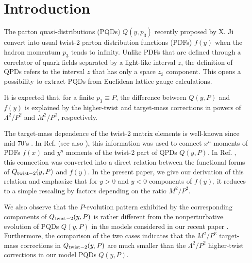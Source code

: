 \documentclass[final,5p,times,twocolumn]{elsarticle}
\begin{document}
   
\section{Introduction}

The parton quasi-distributions (PQDs) $Q(y,p_3)$
recently  proposed by X. Ji  \cite{Ji:2013dva} convert into  usual twist-2 parton distribution 
functions (PDFs) $f(y)$ when the hadron momentum $p_3$ tends to infinity.
Unlike PDFs that are  defined through a correlator of quark fields separated by 
a light-like interval $z$, the definition of QPDs  refers to  the interval $z$ that
has only a space $z_3$ component. This opens a possibility 
to extract PQDs from Euclidean lattice gauge calculations. 

It is expected that,  for a finite $p_3\equiv P$, the difference between $Q(y,P)$ and $f(y)$ 
is  explained  by the higher-twist  and target-mass corrections in powers of $\Lambda^2/P^2$  
and $M^2/P^2$, respectively. 

The target-mass dependence of the twist-2 matrix elements is well-known since mid 70's
\cite{Nachtmann:1973mr,Georgi:1976ve}. In Ref. \cite{Lin:2014zya}    
(see also \cite{Alexandrou:2015rja,Monahan:2016bvm,Zhang:2017bzy}), 
 this information   was used 
to connect   $x^n$ moments of PDFs $f(x)$ and  $y^n$ moments of  the  twist-2 part of QPDs $Q(y,P)$.  In Ref.  \cite{Chen:2016utp}, this  connection was converted into   
 a direct relation
between the functional forms of  $Q_{\rm twist-2} (y,P)$ and  $f(y)$.  
In the present paper, we give our derivation 
of this relation and emphasize that 
for $y>0$ and $y<0$ components of  $f(y)$, it  reduces to    a simple rescaling
by factors depending on the ratio $M^2/P^2$.  

We  also observe  that 
the $P$-evolution pattern exhibited by the corresponding  components of 
$Q_{\rm twist-2} (y,P)$
is rather different from the nonperturbative evolution 
of PQDs $Q(y,P)$ in the models considered in our recent paper
\cite{Radyushkin:2016hsy}.  Furthermore, the comparison of the two cases
indicates that the $M^2/P^2$ target-mass corrections in   $Q_{\rm twist-2} (y,P)$ 
are much smaller than the  $\Lambda^2/P^2$  higher-twist corrections 
in our model PQDs $Q(y,P)$. 
\end{document}
